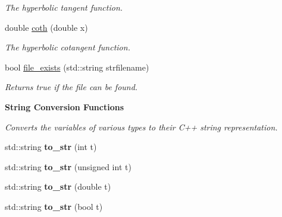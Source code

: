 \begin{DoxyCompactItemize}
\begin{DoxyCompactList}\small\item\em The hyperbolic tangent function. \end{DoxyCompactList}\item 
\hypertarget{namespacepyne_a03cad3093b97f2f6a5dcb5cdc4cb562e}{double \hyperlink{namespacepyne_a03cad3093b97f2f6a5dcb5cdc4cb562e}{coth} (double x)}\label{namespacepyne_a03cad3093b97f2f6a5dcb5cdc4cb562e}

\begin{DoxyCompactList}\small\item\em The hyperbolic cotangent function. \end{DoxyCompactList}\item 
\hypertarget{namespacepyne_ad514c252885b18fb9c6ef3ac5f0ac680}{bool \hyperlink{namespacepyne_ad514c252885b18fb9c6ef3ac5f0ac680}{file\+\_\+exists} (std\+::string strfilename)}\label{namespacepyne_ad514c252885b18fb9c6ef3ac5f0ac680}

\begin{DoxyCompactList}\small\item\em Returns true if the file can be found. \end{DoxyCompactList}\end{DoxyCompactItemize}
\begin{Indent}{\bf String Conversion Functions}\par
{\em Converts the variables of various types to their C++ string representation. }\begin{DoxyCompactItemize}
\item 
\hypertarget{namespacepyne_a06170a309dd11535e158b0beed373b15}{std\+::string {\bfseries to\+\_\+str} (int t)}\label{namespacepyne_a06170a309dd11535e158b0beed373b15}

\item 
\hypertarget{namespacepyne_a44e69084a0b84a3c9b811daebdaa2a61}{std\+::string {\bfseries to\+\_\+str} (unsigned int t)}\label{namespacepyne_a44e69084a0b84a3c9b811daebdaa2a61}

\item 
\hypertarget{namespacepyne_a5011c13958373a872f4de2acfbc2e128}{std\+::string {\bfseries to\+\_\+str} (double t)}\label{namespacepyne_a5011c13958373a872f4de2acfbc2e128}

\item 
\hypertarget{namespacepyne_afbfb8eabf2452faf4e2a5176fec6ebe8}{std\+::string {\bfseries to\+\_\+str} (bool t)}\label{namespacepyne_afbfb8eabf2452faf4e2a5176fec6ebe8}

\end{DoxyCompactItemize}
\end{Indent}
